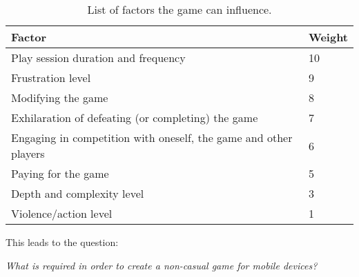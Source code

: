 \begin{table}[h]
\begin{tabular}{|l|l|}
\hline
\rowcolor[HTML]{C0C0C0}
Factor                                                                & Weight \\ \hline
Play session duration and frequency									  & 10     \\ \hline
Frustration level			                                          & 9      \\ \hline
Modifying the game 									                  & 8      \\ \hline
Exhilaration of defeating (or completing) the game 				      & 7      \\ \hline
Engaging in competition with oneself, the game and other players 	  & 6      \\ \hline
Paying for the game          			                              & 5      \\ \hline
Depth and complexity level					                          & 3      \\ \hline
Violence/action level 		                                          & 1      \\ \hline
\end{tabular}
\label{tab:relevantFactors}
\caption{List of factors the game can influence.}
\end{table}



This leads to the question:
\begin{center}\label{intro:problem_statement}
\textit{What is required in order to create a non-casual game for mobile devices?}
\end{center}

